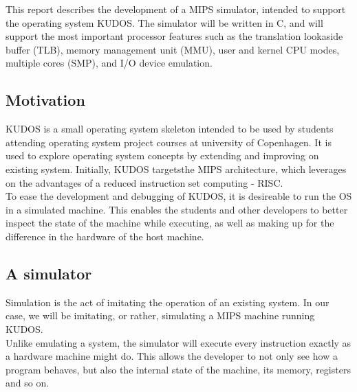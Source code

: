 This report describes the development of a MIPS simulator, intended to support
the operating system KUDOS. The simulator will be written in C, and will
support the most important processor features such as the translation lookaside
buffer (TLB), memory management unit (MMU), user and kernel CPU modes, multiple
cores (SMP), and I/O device emulation. \\


\subsection{Motivation}
KUDOS is a small operating system skeleton intended to be used by students
attending operating system project courses at university of Copenhagen.
It is used to explore operating system concepts by extending and improving on
existing system.
Initially, KUDOS targetsthe MIPS architecture, which leverages on the
advantages of a
reduced instruction set computing - RISC.\\
To ease the development and debugging of KUDOS, it is desireable to run the OS
in a simulated machine. This enables the students and other developers to
better inspect the state of the machine while executing, as well as making up
for the difference in the hardware of the host machine.

\subsection{A simulator}
Simulation is the act of imitating the operation of an existing system. In our
case, we will be imitating, or rather, simulating a MIPS machine running
KUDOS.\\
Unlike emulating a system, the simulator will execute every instruction exactly
as a hardware machine might do. This allows the developer to not only see how
a program behaves, but also the internal state of the machine, its memory,
registers and so on.


